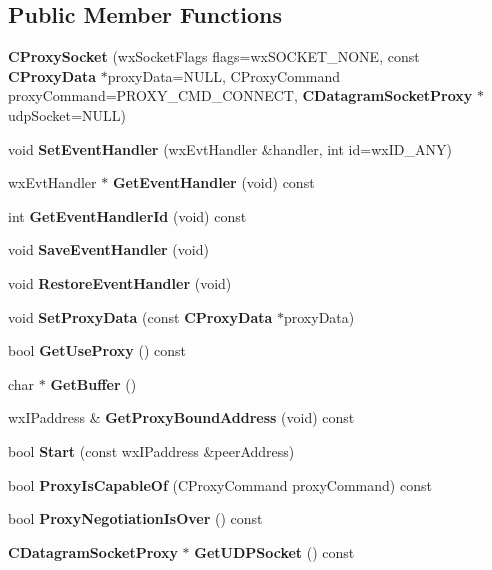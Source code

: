 \subsection*{Public Member Functions}
\begin{DoxyCompactItemize}
\item 
{\bfseries CProxySocket} (wxSocketFlags flags=wxSOCKET\_\-NONE, const {\bf CProxyData} $\ast$proxyData=NULL, CProxyCommand proxyCommand=PROXY\_\-CMD\_\-CONNECT, {\bf CDatagramSocketProxy} $\ast$udpSocket=NULL)\label{classCProxySocket_a79eda1c54c707fc3074ef1b3f6d84613}

\item 
void {\bfseries SetEventHandler} (wxEvtHandler \&handler, int id=wxID\_\-ANY)\label{classCProxySocket_a9335df72f975326b4834a1f93d3d68f3}

\item 
wxEvtHandler $\ast$ {\bfseries GetEventHandler} (void) const \label{classCProxySocket_a6a7526f4dca43a391dd2b56d5e29d26d}

\item 
int {\bfseries GetEventHandlerId} (void) const \label{classCProxySocket_a11be3f2839627b4521267049a691b359}

\item 
void {\bfseries SaveEventHandler} (void)\label{classCProxySocket_a99049602fb6499cad753de3acef7fc8c}

\item 
void {\bfseries RestoreEventHandler} (void)\label{classCProxySocket_a299ab41bd6afb0a9a0f95b7f4c8eef95}

\item 
void {\bfseries SetProxyData} (const {\bf CProxyData} $\ast$proxyData)\label{classCProxySocket_a3f69d9186957bf6dafe5d8e27a878000}

\item 
bool {\bfseries GetUseProxy} () const \label{classCProxySocket_a7664e3e9b5bb2960e226fe6038e2a47d}

\item 
char $\ast$ {\bfseries GetBuffer} ()\label{classCProxySocket_aeffffc4e0639272a53b0a771fbe010d5}

\item 
wxIPaddress \& {\bfseries GetProxyBoundAddress} (void) const \label{classCProxySocket_a66e20b3bed7196c66f878a2c5c2c780b}

\item 
bool {\bfseries Start} (const wxIPaddress \&peerAddress)\label{classCProxySocket_a9287bab4c5a1c45cd1224422b5fb1456}

\item 
bool {\bfseries ProxyIsCapableOf} (CProxyCommand proxyCommand) const \label{classCProxySocket_a1aede350846007226134b0485ecbc8a9}

\item 
bool {\bfseries ProxyNegotiationIsOver} () const \label{classCProxySocket_ab41a46dc82b5225ef2b0b8d4e3834279}

\item 
{\bf CDatagramSocketProxy} $\ast$ {\bfseries GetUDPSocket} () const \label{classCProxySocket_afb2238e33a260631daa04beb74c8a39e}

\end{DoxyCompactItemize}
